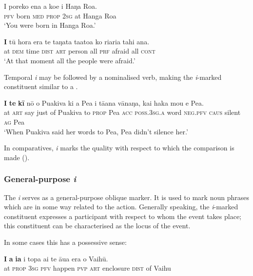 \ea\label{ex:4.245}
\gll I poreko ena a koe {\ꞌ}i Haŋa Roa. \\
\textsc{pfv} born \textsc{med} \textsc{prop} \textsc{2sg} at Hanga Roa \\

\glt 
‘You were born in Hanga Roa.’ \textstyleExampleref{[R380.156]} 
\z

\ea\label{ex:4.246}
\gll \textbf{{\ꞌ}I} tū hora era te taŋata ta{\ꞌ}ato{\ꞌ}a ko ri{\ꞌ}ari{\ꞌ}a tahi {\ꞌ}ana. \\
at \textsc{dem} time \textsc{dist} \textsc{art} person all \textsc{prf} afraid all \textsc{cont} \\

\glt
‘At that moment all the people were afraid.’ \textstyleExampleref{[R210.152]} 
\z

Temporal \textit{{\ꞌ}i} may be followed by a nominalised verb, making the \textit{{\ꞌ}i}{}-marked constituent similar to a .

\ea\label{ex:4.247}
\gll \textbf{{\ꞌ}I} \textbf{te} \textbf{kī} nō o Puakiva ki a Pea i tā{\ꞌ}ana vānaŋa,  kai haka mou e Pea.\\
at \textsc{art} say just of Puakiva to \textsc{prop} Pea \textsc{acc} \textsc{poss.3sg.a} word  \textsc{neg.pfv} \textsc{caus} silent \textsc{ag} Pea\\

\glt
‘When Puakiva said her words to Pea, Pea didn’t silence her.’ \textstyleExampleref{[R229.489]} 
\z

In comparatives, \textit{{\ꞌ}i} marks the quality with respect to which the comparison is made ().

\subsubsection[General{}-purpose i]{General-purpose \textit{i}}\label{sec:4.7.2.3}
The  \textit{i} serves as a general-purpose oblique marker. It is used to mark noun phrases which are in some way related to the action. Generally speaking, the \textit{i}{}-marked constituent expresses a participant with respect to whom the event takes place; this constituent can be characterised as the locus of the event.

In some cases this  has a possessive sense:

\ea\label{ex:4.256}
\gll \textbf{I} \textbf{a} \textbf{ia} i topa ai te {\ꞌ}āua era o Vaihū.\\
at \textsc{prop} \textsc{3sg} \textsc{pfv} happen \textsc{pvp} \textsc{art} enclosure \textsc{dist} of Vaihu\\

